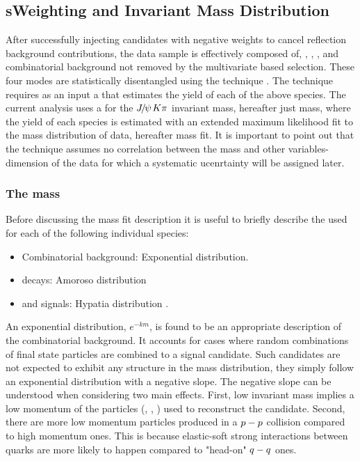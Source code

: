 \subsection{sWeighting and Invariant Mass Distribution}
\label{sWeighting_and_mass}

After successfully injecting candidates with negative weights to cancel reflection background contributions,
the data sample is effectively composed of, \BdJpsiKpi, \BsJpsiKpi, \LbJpsippi, and combinatorial background not removed by the
multivariate based selection. These four modes are statistically disentangled using the \sPlot technique \cite{splot}.
The technique requires as an input a \pdf that estimates the yield of each of the above species. The current analysis uses
a \pdf for the ${J\mskip -3mu/\mskip -2mu\psi\mskip 2mu} K\pi$ invariant mass, hereafter just mass, where the yield of each species is estimated with an extended
maximum likelihood fit to the mass distribution of data, hereafter mass fit. It is important to point out that the \sPlot
technique assumes no correlation between the mass and other variables-dimension of the data for which a systematic ucenrtainty 
will be assigned later.

\subsubsection{The mass \pdf}
Before discussing the mass fit description it is useful to briefly describe the \pdfs used for each of the following individual species:

\begin{itemize}
\item Combinatorial background: Exponential distribution.
\item \LbJpsippi decays: Amoroso distribution \cite{Amoroso}
\item \Bd and \Bs signals: Hypatia distribution \cite{Santos:2013gra}.
\end{itemize}

\noindent An exponential distribution, $e^{-km}$, is found to be an appropriate description of the combinatorial background. It accounts
for cases where random combinations of final state particles are combined to a signal candidate. Such candidates are not expected to
exhibit any structure in the mass distribution, they simply follow an exponential distribution with a negative slope.
The negative slope can be understood when considering two main effects. First, low \Bs invariant mass implies a low momentum of
the particles (\kaon, \pion, \mmu) used to reconstruct the \BsJpsiKst candidate. Second, there are more low momentum particles produced in
a $p-p$ collision compared to high momentum ones. This is because elastic-soft strong interactions between quarks are more
likely to happen compared to "head-on" $q-q$ ones.

